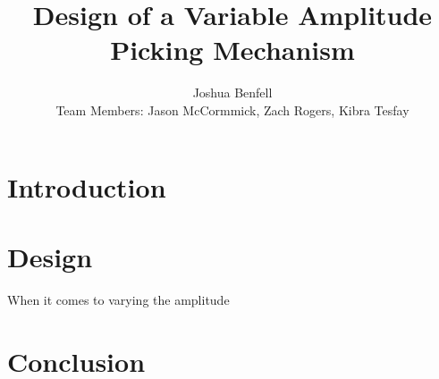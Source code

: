 \documentclass[12pt, a4paper, onecolumn]{IEEEtran}
\title{Design of a Variable Amplitude Picking Mechanism}
\author{Joshua Benfell\\Team Members: Jason McCormmick, Zach Rogers, Kibra Tesfay}
\begin{document}
	\maketitle
    \section{Introduction}
    \section{Design}
        When it comes to varying the amplitude
    \section{Conclusion}

    \printbibliography
\end{document}
